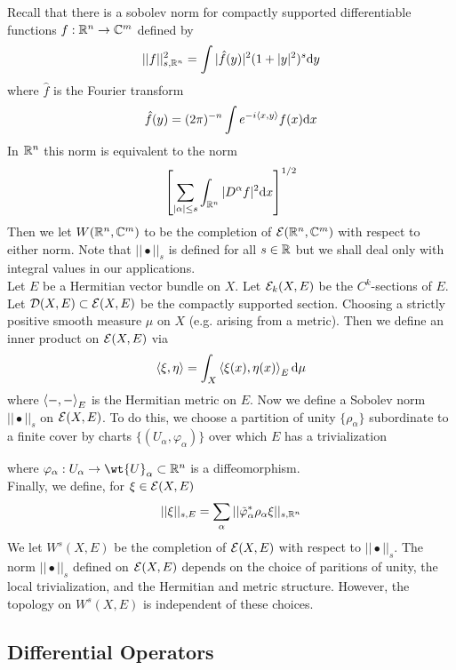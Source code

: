 \documentclass[12pt]{article}
\begin{document}
Recall that there is a sobolev norm for compactly supported differentiable functions $f : \mathbb{R}^n \to \mathbb{C}^m$ defined by 
\[ || f ||_{s, \mathbb{R}^n}^2 = \int | \hat{f}(y) |^2 (1 + |y|^2)^s \mathrm{d}{y} \]
where $\hat{f}$ is the Fourier transform
\[ \hat{f}(y) = (2 \pi)^{-n} \int e^{-i \left< x, y \right>} f(x) \mathrm{d}{x} \]
In $\mathbb{R}^n$ this norm is equivalent to the norm
\[ \left[ \sum_{|\alpha| \le s} \int_{\mathbb{R}^n} |D^\alpha f|^2 \mathrm{d}{x} \right]^{1/2} \]
Then we let $W(\mathbb{R}^n, \mathbb{C}^m)$ to be the completion of $\mathcal{E}(\mathbb{R}^n, \mathbb{C}^m)$ with respect to either norm. Note that $|| \bullet ||_s$ is defined for all $s \in \mathbb{R}$ but we shall deal only with integral values in our applications.
\bigskip\\
Let $E$ be a Hermitian vector bundle on $X$. Let $\mathcal{E}_k(X, E)$ be the $C^k$-sections of $E$. Let $\mathcal{D}(X, E) \subset \mathcal{E}(X, E)$ be the compactly supported section. Choosing a strictly positive smooth measure $\mu$ on $X$ (e.g. arising from a metric). Then we define an inner product on $\mathcal{E}(X, E)$ via
\[ \left< \xi, \eta \right> = \int_X \left< \xi(x), \eta(x) \right>_E \mathrm{d}{\mu} \]
where $\left< -, - \right>_E$ is the Hermitian metric on $E$. Now we define a Sobolev norm $|| \bullet ||_s$ on $\mathcal{E}(X, E)$. To do this, we choose a partition of unity $\{ \rho_\alpha \}$ subordinate to a finite cover by charts $\{ (U_\alpha, \varphi_\alpha) \}$ over which $E$ has a trivialization 
\begin{center}
\end{center}
where $\varphi_\alpha : U_\alpha \to \wt{U}_\alpha \subset \RR^n$ is a diffeomorphism. 
\bigskip\\
Finally, we define, for $\xi \in \mathcal{E}(X, E)$
\[ || \xi ||_{s,E} = \sum_\alpha || \tilde{\varphi}_\alpha^* \rho_\alpha \xi ||_{s, \mathbb{R}^n} \]
We let $W^s(X, E)$ be the completion of $\mathcal{E}(X, E)$ with respect to $|| \bullet ||_s$. The norm $|| \bullet ||_s$ defined on $\mathcal{E}(X, E)$ depends on the choice of paritions of unity, the local trivialization, and the Hermitian and metric structure. However, the topology on $W^s(X, E)$ is independent of these choices. 

\subsection{Differential Operators}
\end{document}
